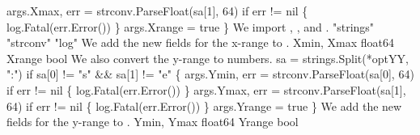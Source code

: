           args.Xmax, err = strconv.ParseFloat(sa[1], 64)
          if err != nil \{ log.Fatal(err.Error()) \}
          args.Xrange = true
\}
\nwendcode{}\nwdocspar
We import , , and .
\nwenddocs{}\plusendmoddef\nwstartdeflinemarkup{}\nwenddeflinemarkup
"strings"
"strconv"
"log"
\nwendcode{}\nwdocspar
We add the new fields for the x-range to .
\nwenddocs{}\plusendmoddef\nwstartdeflinemarkup{}\nwenddeflinemarkup
Xmin, Xmax float64
Xrange bool
\nwendcode{}\nwdocspar
We also convert the y-range to numbers.
\nwenddocs{}\endmoddef\nwstartdeflinemarkup{}\nwenddeflinemarkup
sa = strings.Split(*optYY, ":")
if sa[0] != "s" && sa[1] != "e" \{
          args.Ymin, err = strconv.ParseFloat(sa[0], 64)
          if err != nil \{ log.Fatal(err.Error()) \}
          args.Ymax, err = strconv.ParseFloat(sa[1], 64)
          if err != nil \{ log.Fatal(err.Error()) \}
          args.Yrange = true
\}
\nwendcode{}\nwdocspar
We add the new fields for the y-range to .
\nwenddocs{}\plusendmoddef\nwstartdeflinemarkup{}\nwenddeflinemarkup
Ymin, Ymax float64
Yrange bool
\nwendcode{}\nwdocspar
